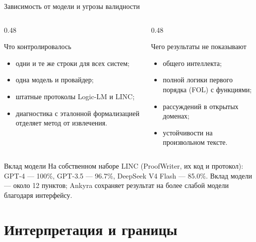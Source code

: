 \documentclass[aspectratio=169,11pt]{beamer}
\begin{document}
\begin{frame}{Зависимость от модели и угрозы валидности}
  \footnotesize
  \begin{columns}[T,onlytextwidth]
    \begin{column}{0.48\textwidth}
      \begin{block}{Что контролировалось}
        \begin{itemize}
          \item одни и те же строки для всех систем;
          \item одна модель и провайдер;
          \item штатные протоколы Logic-LM и LINC;
          \item диагностика с эталонной формализацией отделяет метод
                от извлечения.
        \end{itemize}
      \end{block}
    \end{column}
    \begin{column}{0.48\textwidth}
      \begin{block}{Чего результаты не показывают}
        \begin{itemize}
          \item общего интеллекта;
          \item полной логики первого порядка (FOL) с функциями;
          \item рассуждений в открытых доменах;
          \item устойчивости на произвольном тексте.
        \end{itemize}
      \end{block}
    \end{column}
  \end{columns}

  \vspace{2mm}
  \begin{block}{Вклад модели}
    На собственном наборе LINC (ProofWriter, их код и протокол):
    GPT-4 --- 100\%, GPT-3.5 --- 96.7\%, DeepSeek V4 Flash --- 85.0\%.
    Вклад модели --- около 12 пунктов; Ankyra сохраняет результат на более
    слабой модели благодаря интерфейсу.
  \end{block}
\end{frame}

\section{Интерпретация и границы}
\end{document}
